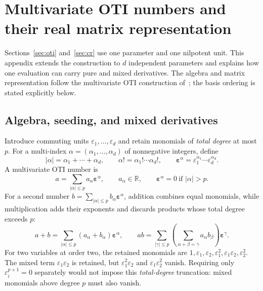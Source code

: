 \section{Multivariate OTI numbers and their real matrix representation}
\label{sec:multivariate}
Sections~\ref{sec:oti} and~\ref{sec:cr} use one parameter and one nilpotent unit.
This appendix extends the construction to $d$ independent parameters and
explains how one evaluation can carry pure and mixed derivatives. The algebra
and matrix representation follow the multivariate OTI construction
of~\cite{aristizabal2020}; the basis ordering is stated explicitly below.

\subsection{Algebra, seeding, and mixed derivatives}
\label{sec:multi-algebra}
Introduce commuting units $\varepsilon_1,\ldots,\varepsilon_d$ and retain
monomials of \emph{total degree} at most $p$. For a multi-index
$\alpha=(\alpha_1,\ldots,\alpha_d)$ of nonnegative integers, define
\[
 |\alpha|=\alpha_1+\cdots+\alpha_d,\qquad
 \alpha!=\alpha_1!\cdots\alpha_d!,\qquad
 \boldsymbol\varepsilon^\alpha=
 \varepsilon_1^{\alpha_1}\cdots\varepsilon_d^{\alpha_d}.
\]
A multivariate OTI number is
\begin{equation}
\label{eq:multi-number}
 a=\sum_{|\alpha|\leq p}a_\alpha\boldsymbol\varepsilon^\alpha,
 \qquad a_\alpha\in\mathbb R,
 \qquad \boldsymbol\varepsilon^\alpha=0\ \text{if }|\alpha|>p.
\end{equation}
For a second number $b=\sum_{|\alpha|\leq p}b_\alpha\boldsymbol\varepsilon^\alpha$,
addition combines equal monomials, while multiplication adds their exponents
and discards products whose total degree exceeds $p$:
\begin{equation}
\label{eq:multi-arithmetic}
 a+b=\sum_{|\alpha|\leq p}(a_\alpha+b_\alpha)
           \boldsymbol\varepsilon^\alpha,\qquad
 ab=\sum_{|\gamma|\leq p}
       \left(\sum_{\alpha+\beta=\gamma}a_\alpha b_\beta\right)
       \boldsymbol\varepsilon^\gamma.
\end{equation}
For two variables at order two, the retained monomials are
$1,\varepsilon_1,\varepsilon_2,\varepsilon_1^2,
\varepsilon_1\varepsilon_2,\varepsilon_2^2$.
The mixed term $\varepsilon_1\varepsilon_2$ is retained, but
$\varepsilon_1^2\varepsilon_2$ and $\varepsilon_1\varepsilon_2^2$ vanish.
Requiring only $\varepsilon_i^{p+1}=0$ separately would not impose this
\emph{total-degree} truncation: mixed monomials above degree $p$ must also vanish.

